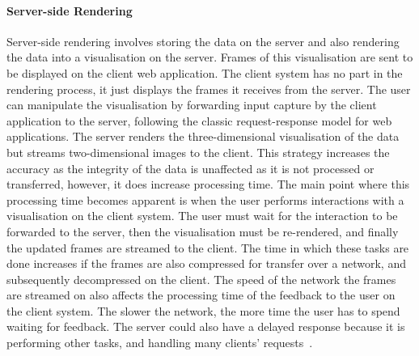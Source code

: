 \paragraph{Server-side Rendering}
Server-side rendering involves storing the data on the server and also rendering the data into a visualisation on the server.
Frames of this visualisation are sent to be displayed on the client web application.
The client system has no part in the rendering process, it just displays the frames it receives from the server. 
The user can manipulate the visualisation by forwarding input capture by the client application to the server, following the classic request-response model for web applications.
The server renders the three-dimensional visualisation of the data but streams two-dimensional images to the client.
This strategy increases the accuracy as the integrity of the data is unaffected as it is not processed or transferred, however, it does increase processing time.
The main point where this processing time becomes apparent is when the user performs interactions with a visualisation on the client system.
The user must wait for the interaction to be forwarded to the server, then the visualisation must be re-rendered, and finally the updated frames are streamed to the client.
The time in which these tasks are done increases if the frames are also compressed for transfer over a network, and subsequently decompressed on the client.
The speed of the network the frames are streamed on also affects the processing time of the feedback to the user on the client system.
The slower the network, the more time the user has to spend waiting for feedback.
The server could also have a delayed response because it is performing other tasks, and handling many clients' requests~\cite{Becker1987}.


